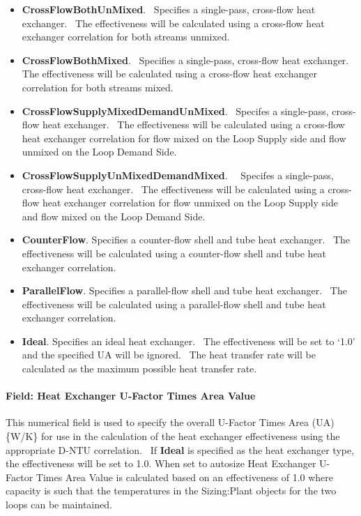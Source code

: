 \begin{itemize}
\item
  \textbf{CrossFlowBothUnMixed}.~ Specifies a single-pass, cross-flow heat exchanger.~ The effectiveness will be calculated using a cross-flow heat exchanger correlation for both streams unmixed.
\item
  \textbf{CrossFlowBothMixed}.~ Specifies a single-pass, cross-flow heat exchanger. The effectiveness will be calculated using a cross-flow heat exchanger correlation for both streams mixed.
\item
  \textbf{CrossFlowSupplyMixedDemandUnMixed}.~ Specifes a single-pass, cross-flow heat exchanger.~ The effectiveness will be calculated using a cross-flow heat exchanger correlation for flow mixed on the Loop Supply side and flow unmixed on the Loop Demand Side.
\item
  \textbf{CrossFlowSupplyUnMixedDemandMixed}.~~ Specifes a single-pass, cross-flow heat exchanger.~ The effectiveness will be calculated using a cross-flow heat exchanger correlation for flow unmixed on the Loop Supply side and flow mixed on the Loop Demand Side.
\item
  \textbf{CounterFlow}. Specifies a counter-flow shell and tube heat exchanger.~ The effectiveness will be calculated using a counter-flow shell and tube heat exchanger correlation.
\item
  \textbf{ParallelFlow}. Specifies a parallel-flow shell and tube heat exchanger.~ The effectiveness will be calculated using a parallel-flow shell and tube heat exchanger correlation.
\item
  \textbf{Ideal}. Specifies an ideal heat exchanger.~ The effectiveness will be set to `1.0' and the specified UA will be ignored.~ The heat transfer rate will be calculated as the maximum possible heat transfer rate.
\end{itemize}

\paragraph{Field: Heat Exchanger U-Factor Times Area Value}\label{field-heat-exchanger-u-factor-times-area-value}

This numerical field is used to specify the overall U-Factor Times Area (UA) \{W/K\} for use in the calculation of the heat exchanger effectiveness using the appropriate D-NTU correlation.~ If \textbf{Ideal} is specified as the heat exchanger type, the effectiveness will be set to 1.0. When set to autosize Heat Exchanger U-Factor Times Area Value is calculated based on an effectiveness of 1.0 where capacity is such that the temperatures in the Sizing:Plant objects for the two loops can be maintained.

